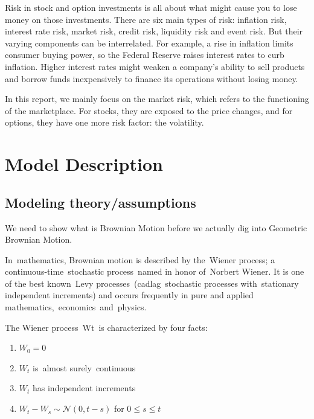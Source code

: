 \documentclass[letterpaper,11pt, oneside]{layout}
\begin{document}
Risk in stock and option investments is all about what might cause you to lose money on those investments. There are six main types of risk: inflation risk, interest rate risk, market risk, credit risk, liquidity risk and event risk. But their varying components can be interrelated. For example, a rise in inflation limits consumer buying power, so the Federal Reserve raises interest rates to curb inflation. Higher interest rates might weaken a company's ability to sell products and borrow funds inexpensively to finance its operations without losing money. 

In this report, we mainly focus on the market risk, which refers to the functioning of the marketplace. For stocks, they are exposed to the price changes, and for options, they have one more risk factor: the volatility.




\begingroup
\renewcommand{\clearpage}{}
\chapter{Model Description}
\label{chap:md}
\endgroup

\section{Modeling theory/assumptions}
\label{sec:md:mt}

We need to show what is Brownian Motion before we actually dig into Geometric Brownian Motion.

In mathematics, Brownian motion is described by the Wiener process; a continuous-time stochastic process named in honor of Norbert Wiener. It is one of the best known Levy processes (cadlag stochastic processes with stationary 
independent
increments) and occurs frequently in pure and applied mathematics, economics and physics.

The Wiener process Wt is characterized by four facts:

\begin{enumerate}
\item $W_0=0$
\item $W_t$ is almost surely continuous
\item $W_t$ has independent increments
\item $W_t-W_s\sim \mathcal{N}(0,t-s)$ for $0\le s\le t$
\end{enumerate}
\end{document}
